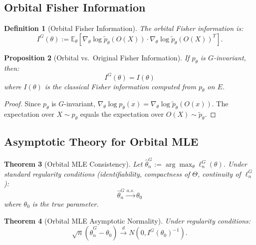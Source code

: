 \documentclass[11pt]{article}
\newtheorem{theorem}{Theorem}[section]
\newtheorem{proposition}[theorem]{Proposition}
\newtheorem{definition}[theorem]{Definition}
\newcommand{\E}{\mathbb{E}}
\begin{document}
\subsection{Orbital Fisher Information}

\begin{definition}[Orbital Fisher Information]\label{def:orbital_fisher}
The orbital Fisher information is:
\begin{equation}\label{eq:orbital_fisher}
I^G(\theta) := \E_\theta\left[ \nabla_\theta \log \tilde{p}_\theta(O(X)) \cdot \nabla_\theta \log \tilde{p}_\theta(O(X))^T \right].
\end{equation}
\end{definition}

\begin{proposition}[Orbital vs.\ Original Fisher Information]\label{prop:fisher_equality}
If $p_\theta$ is $G$-invariant, then:
\begin{equation}\label{eq:fisher_equality}
I^G(\theta) = I(\theta)
\end{equation}
where $I(\theta)$ is the classical Fisher information computed from $p_\theta$ on $E$.
\end{proposition}

\begin{proof}
Since $p_\theta$ is $G$-invariant, $\nabla_\theta \log p_\theta(x) = \nabla_\theta \log \tilde{p}_\theta(O(x))$. The expectation over $X \sim p_\theta$ equals the expectation over $O(X) \sim \tilde{p}_\theta$.
\end{proof}

\subsection{Asymptotic Theory for Orbital MLE}

\begin{theorem}[Orbital MLE Consistency]\label{thm:mle_consistency}
Let $\hat{\theta}_n^G := \arg\max_\theta \ell_n^G(\theta)$. Under standard regularity conditions (identifiability, compactness of $\Theta$, continuity of $\ell_n^G$):
\begin{equation}\label{eq:mle_consistency}
\hat{\theta}_n^G \xrightarrow{a.s.} \theta_0
\end{equation}
where $\theta_0$ is the true parameter.
\end{theorem}

\begin{theorem}[Orbital MLE Asymptotic Normality]\label{thm:orbital_mle}
Under regularity conditions:
\begin{equation}\label{eq:mle_normality}
\sqrt{n}(\hat{\theta}_n^G - \theta_0) \xrightarrow{d} N(0, I^G(\theta_0)^{-1}).
\end{equation}
\end{theorem}
\end{document}
